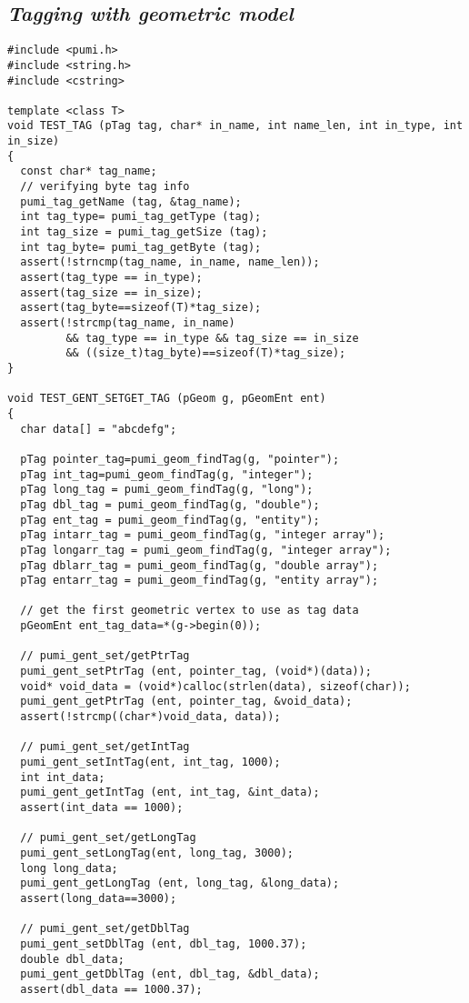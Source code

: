 \subsection{\textit{Tagging with geometric model}}
\begin{small}
\begin{verbatim}
#include <pumi.h>
#include <string.h>
#include <cstring>

template <class T>
void TEST_TAG (pTag tag, char* in_name, int name_len, int in_type, int in_size)
{
  const char* tag_name;
  // verifying byte tag info
  pumi_tag_getName (tag, &tag_name);
  int tag_type= pumi_tag_getType (tag);
  int tag_size = pumi_tag_getSize (tag);
  int tag_byte= pumi_tag_getByte (tag);
  assert(!strncmp(tag_name, in_name, name_len));
  assert(tag_type == in_type);
  assert(tag_size == in_size);
  assert(tag_byte==sizeof(T)*tag_size);
  assert(!strcmp(tag_name, in_name)
         && tag_type == in_type && tag_size == in_size 
         && ((size_t)tag_byte)==sizeof(T)*tag_size);
}

void TEST_GENT_SETGET_TAG (pGeom g, pGeomEnt ent)
{
  char data[] = "abcdefg";

  pTag pointer_tag=pumi_geom_findTag(g, "pointer");
  pTag int_tag=pumi_geom_findTag(g, "integer");
  pTag long_tag = pumi_geom_findTag(g, "long");
  pTag dbl_tag = pumi_geom_findTag(g, "double");
  pTag ent_tag = pumi_geom_findTag(g, "entity");
  pTag intarr_tag = pumi_geom_findTag(g, "integer array");
  pTag longarr_tag = pumi_geom_findTag(g, "integer array");
  pTag dblarr_tag = pumi_geom_findTag(g, "double array");
  pTag entarr_tag = pumi_geom_findTag(g, "entity array");

  // get the first geometric vertex to use as tag data
  pGeomEnt ent_tag_data=*(g->begin(0));

  // pumi_gent_set/getPtrTag 
  pumi_gent_setPtrTag (ent, pointer_tag, (void*)(data));
  void* void_data = (void*)calloc(strlen(data), sizeof(char));
  pumi_gent_getPtrTag (ent, pointer_tag, &void_data);
  assert(!strcmp((char*)void_data, data));

  // pumi_gent_set/getIntTag 
  pumi_gent_setIntTag(ent, int_tag, 1000);
  int int_data;
  pumi_gent_getIntTag (ent, int_tag, &int_data);
  assert(int_data == 1000);

  // pumi_gent_set/getLongTag
  pumi_gent_setLongTag(ent, long_tag, 3000);
  long long_data; 
  pumi_gent_getLongTag (ent, long_tag, &long_data);
  assert(long_data==3000);

  // pumi_gent_set/getDblTag
  pumi_gent_setDblTag (ent, dbl_tag, 1000.37);
  double dbl_data;
  pumi_gent_getDblTag (ent, dbl_tag, &dbl_data);
  assert(dbl_data == 1000.37);


\end{verbatim}
\end{small}
